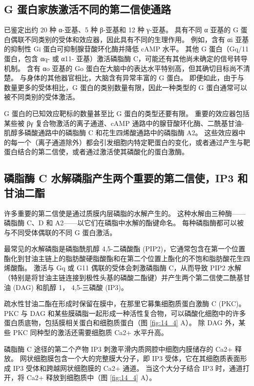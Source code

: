 \subsection{G 蛋白家族激活不同的第二信使通路}
已鉴定出约 20 种 α-亚基、5 种 β-亚基和 12 种 γ-亚基。
具有不同 α 亚基的 G 蛋白偶联不同类别的受体和效应器，因此具有不同的生理作用。
例如，含有 αi 亚基的抑制性 Gi 蛋白可抑制腺苷酸环化酶并降低 cAMP 水平。
其他 G 蛋白（Gq/11 蛋白，包含 αq- 或 α11- 亚基）激活磷脂酶 C，可能还有其他尚未确定的信号转导机制。
含有 αo 亚基的 Go 蛋白在大脑中的表达水平特别高，但其确切目标尚不清楚。
与身体的其他器官相比，大脑含有异常丰富的 G 蛋白。 
即便如此，由于与数量更多的受体相比，G 蛋白的类别数量有限，因此一种类型的 G 蛋白通常可以被不同类别的受体激活。


G 蛋白的已知效应靶标的数量甚至比 G 蛋白的类型还要有限。
重要的效应器包括某些被 βγ 复合物激活的离子通道、cAMP 通路中的腺苷酸环化酶、二酰基甘油-肌醇多磷酸通路中的磷脂酶 C 和花生四烯酸通路中的磷脂酶 A2。 
这些效应器中的每一个（离子通道除外）都会引发细胞内特定靶蛋白的变化，或者通过产生与靶蛋白结合的第二信使，或者通过激活使其磷酸化的蛋白激酶。


\subsection{磷脂酶 C 水解磷脂产生两个重要的第二信使，IP3 和甘油二酯}

许多重要的第二信使是通过质膜内层磷脂的水解产生的。 
这种水解由三种酶——磷脂酶 C、D 和 A2——以它们在磷脂中水解的酯键命名。 
每种磷脂酶都可以被与不同受体偶联的不同 G 蛋白激活。


最常见的水解磷脂是磷脂酰肌醇 4,5-二磷酸酯 (PIP2)，它通常包含在第一个位置酯化到甘油主链上的脂肪酸硬脂酸酯和在第二个位置上酯化的不饱和脂肪酸花生四烯酸酯。
激活与 Gq 或 G11 偶联的受体会刺激磷脂酶 C，从而导致 PIP2 水解（特别是将甘油主链连接到极性头基的磷酸二酯键）并产生两个第二信使二酰基甘油 (DAG) 和肌醇 1， 4,5-三磷酸 (IP3)。


疏水性甘油二酯在形成时保留在膜中，在那里它募集细胞质蛋白激酶 C (PKC)。
PKC 与 DAG 和某些膜磷脂一起形成一种活性复合物，可以磷酸化细胞中的许多蛋白质底物，包括膜相关蛋白和细胞质蛋白（图 \ref{fig:14_4} A）。
除 DAG 外，某些 PKC 同种型的激活还需要细胞质 Ca2+ 水平升高。


磷脂酶 C 途径的第二个产物 IP3 刺激平滑内质网腔中细胞内膜储存的 Ca2+ 释放。
网状细胞膜包含一个大的完整膜大分子，即 IP3 受体，它在其细胞质表面形成 IP3 受体和跨越网状细胞膜的 Ca2+ 通道。
当这个大分子结合 IP3 时，通道打开，将 Ca2+ 释放到细胞质中（图 \ref{fig:14_4} A）。


